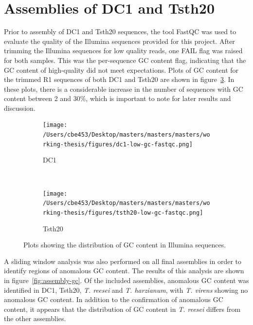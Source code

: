 \section{Assemblies of DC1 and Tsth20}

Prior to assembly of DC1 and Tsth20 sequences, the tool FastQC was
used to evaluate the quality of the Illumina sequences provided for
this project. After trimming the Illumina sequences for low quality
reads, one FAIL flag was raised for both samples. This was the
per-sequence GC content flag, indicating that the GC content of
high-quality did not meet expectations. Plots of GC content for the
trimmed R1 sequences of both DC1 and Tsth20 are shown in
figure~\ref{fig:fastqc-lowgc}. In these plots, there is a considerable
increase in the number of sequences with GC content between 2 and 30\%,
which is important to note for later results and discussion.

\begin{figure}
  \centering
  \begin{subfigure}{0.8\textwidth}
    \texttt{[image: /Users/cbe453/Desktop/masters/masters/masters/working-thesis/figures/dc1-low-gc-fastqc.png]}
    \caption{DC1}
    \label{fig:dc1fastqc}
  \end{subfigure}
  \\
  \begin{subfigure}{0.8\textwidth}
  \texttt{[image: /Users/cbe453/Desktop/masters/masters/masters/working-thesis/figures/tsth20-low-gc-fastqc.png]}
    \caption{Tsth20}
    \label{fig:tsth20fastqc}
  \end{subfigure}
  \caption{Plots showing the distribution of GC content in Illumina
    sequences.}
  \label{fig:fastqc-lowgc}
\end{figure}

A sliding window analysis was also performed on all final assemblies
in order to identify regions of anomalous GC content. The results of
this analysis are shown in figure~\ref{fig:assembly-gc}. Of the
included assemblies, anomalous GC content was identified in DC1,
Tsth20, \textit{T. reesei} and \textit{T. harzianum}, with
\textit{T. virens} showing no anomalous GC content. In addition to the
confirmation of anomalous GC content, it appears that the distribution
of GC content in \textit{T. reesei} differs from the other assemblies.


